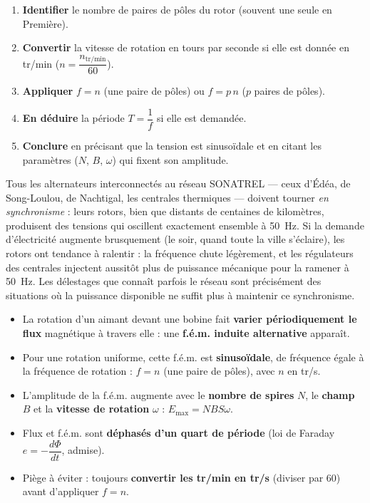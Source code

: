 \documentclass[11pt]{article}
\begin{document}
\begin{methode}
\begin{enumerate}
\item \textbf{Identifier} le nombre de paires de pôles du rotor (souvent une seule en Première).
\item \textbf{Convertir} la vitesse de rotation en tours par seconde si elle est donnée en tr/min ($n = \dfrac{n_{\text{tr/min}}}{60}$).
\item \textbf{Appliquer} $f = n$ (une paire de pôles) ou $f = p\,n$ ($p$ paires de pôles).
\item \textbf{En déduire} la période $T = \dfrac{1}{f}$ si elle est demandée.
\item \textbf{Conclure} en précisant que la tension est sinusoïdale et en citant les paramètres ($N$, $B$, $\omega$) qui fixent son amplitude.
\end{enumerate}
\end{methode}

\begin{savaistu}
Tous les alternateurs interconnectés au réseau SONATREL — ceux d'Édéa, de Song-Loulou, de Nachtigal, les centrales thermiques — doivent tourner \emph{en synchronisme} : leurs rotors, bien que distants de centaines de kilomètres, produisent des tensions qui oscillent exactement ensemble à \SI{50}{Hz}. Si la demande d'électricité augmente brusquement (le soir, quand toute la ville s'éclaire), les rotors ont tendance à ralentir : la fréquence chute légèrement, et les régulateurs des centrales injectent aussitôt plus de puissance mécanique pour la ramener à \SI{50}{Hz}. Les délestages que connaît parfois le réseau sont précisément des situations où la puissance disponible ne suffit plus à maintenir ce synchronisme.
\end{savaistu}

\begin{aretenir}
\begin{itemize}
\item La rotation d'un aimant devant une bobine fait \textbf{varier périodiquement le flux} magnétique à travers elle : une \textbf{f.é.m. induite alternative} apparaît.
\item Pour une rotation uniforme, cette f.é.m. est \textbf{sinusoïdale}, de fréquence égale à la fréquence de rotation : $f = n$ (une paire de pôles), avec $n$ en tr/s.
\item L'amplitude de la f.é.m. augmente avec le \textbf{nombre de spires} $N$, le \textbf{champ} $B$ et la \textbf{vitesse de rotation} $\omega$ : $E_{\max} = NBS\omega$.
\item Flux et f.é.m. sont \textbf{déphasés d'un quart de période} (loi de Faraday $e = -\dfrac{d\Phi}{dt}$, admise).
\item Piège à éviter : toujours \textbf{convertir les tr/min en tr/s} (diviser par 60) avant d'appliquer $f = n$.
\end{itemize}
\end{aretenir}
\end{document}
